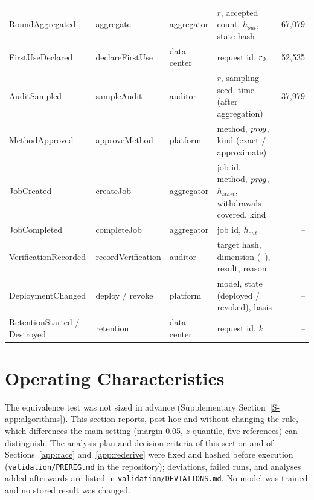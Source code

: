 \begin{table}[t]
{\begin{tabular}{@{}l l l p{} r@{}}
RoundAggregated & aggregate & aggregator & $r$, accepted count, $h_{\mathit{out}}$, state hash & 67,079 \\
FirstUseDeclared & declareFirstUse & data center & request id, $r_0$ & 52,535 \\
AuditSampled & sampleAudit & auditor & $r$, sampling seed, time (after aggregation) & 37,979 \\
MethodApproved & approveMethod & platform & method, $\mathit{prog}$, kind (exact / approximate) & -- \\
JobCreated & createJob & aggregator & job id, method, $\mathit{prog}$, $h_{\mathit{start}}$, withdrawals covered, kind & -- \\
JobCompleted & completeJob & aggregator & job id, $h_{\mathit{out}}$ & -- \\
VerificationRecorded & recordVerification & auditor & target hash, dimension (\Lone{}--\Lfour{}), result, reason & -- \\
DeploymentChanged & deploy / revoke & platform & model, state (deployed / revoked), basis & -- \\
RetentionStarted / Destroyed & retention & data center & request id, $k$ & -- \\
\bottomrule
\end{tabular}}
\end{table}

\section{\Lthree{} Operating Characteristics}
\label{app:l3power}
The \Lthree{} equivalence test was not sized in advance (Supplementary Section~\ref{S-app:algorithms}). This section reports, post hoc and without changing the rule, which differences the main setting (margin 0.05, $z$ quantile, five references) can distinguish. The analysis plan and decision criteria of this section and of Sections~\ref{app:race} and~\ref{app:rederive} were fixed and hashed before execution (\texttt{validation/PREREG.md} in the repository); deviations, failed runs, and analyses added afterwards are listed in \texttt{validation/DEVIATIONS.md}. No model was trained and no stored result was changed.

